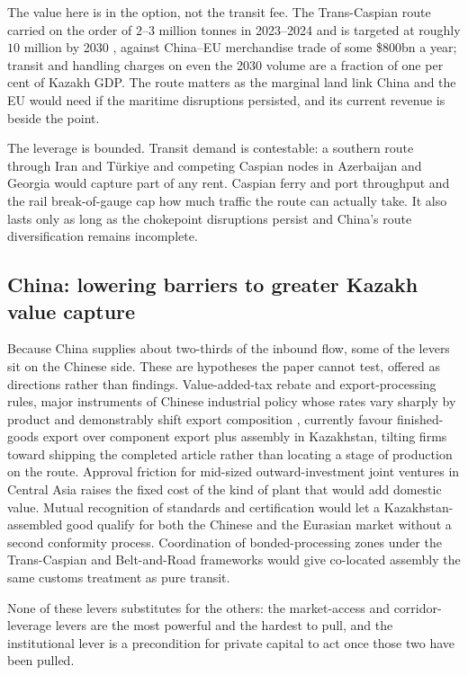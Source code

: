 \documentclass[12pt]{article}
\begin{document}
The value here is in the option, not the transit fee. The Trans-Caspian route
carried on the order of $2$--$3$ million tonnes in 2023--2024 and is targeted at roughly
$10$ million by 2030 \citep{worldbank2023middlecorridor}, against China--EU merchandise trade
of some \$800bn a year; transit and handling charges on even the 2030 volume are a fraction of
one per cent of Kazakh GDP. The route matters as the marginal
land link China and the EU would need if the maritime disruptions persisted, and its current
revenue is beside the point.

The leverage is bounded. Transit demand is contestable: a southern route through Iran and
T\"urkiye and competing Caspian nodes in Azerbaijan and Georgia would capture part of any
rent. Caspian ferry and port throughput and the rail break-of-gauge cap how much traffic the
route can actually take. It also lasts only as long as the chokepoint disruptions persist and
China's route diversification remains incomplete.

\subsection{China: lowering barriers to greater Kazakh value capture}

Because China supplies about two-thirds of the inbound flow, some of the levers sit on the
Chinese side. These are hypotheses the paper cannot test, offered as directions rather than
findings. Value-added-tax rebate and export-processing rules, major instruments of Chinese
industrial policy whose rates vary sharply by product and demonstrably shift export
composition \citep{gourdon2022vat}, currently favour finished-goods export over component
export plus assembly in Kazakhstan, tilting firms toward shipping the completed article rather
than locating a stage of production on the route. Approval friction
for mid-sized outward-investment joint ventures in Central Asia raises the fixed cost of the
kind of plant that would add domestic value. Mutual recognition of standards and certification
would let a Kazakhstan-assembled good qualify for both the Chinese and the Eurasian market
without a second conformity process. Coordination of bonded-processing zones under the
Trans-Caspian and Belt-and-Road frameworks would give co-located assembly the same customs
treatment as pure transit.

None of these levers substitutes for the others: the market-access and corridor-leverage
levers are the most powerful and the hardest to pull, and the institutional lever is a
precondition for private capital to act once those two have been pulled.
\end{document}
